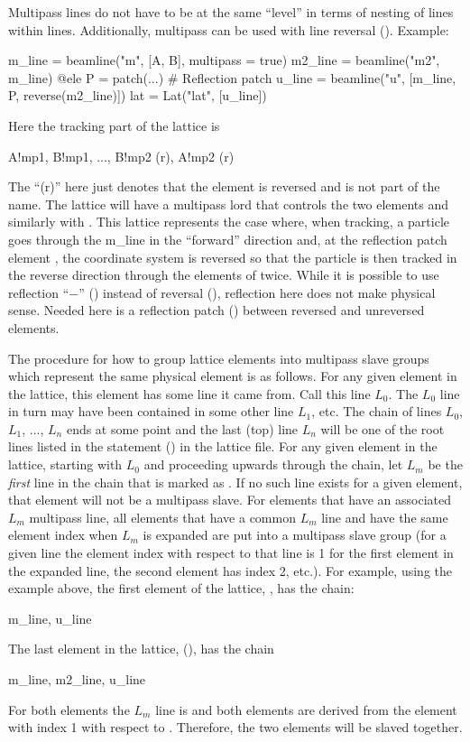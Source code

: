 Multipass lines do not have to be at the same ``level'' in terms of nesting of lines within
lines. Additionally, multipass can be used with line reversal (). Example:
\begin{example}
  m_line = beamline("m", [A, B], multipass = true)
  m2_line = beamline("m2", m_line)
  @ele P = patch(...)  # Reflection patch
  u_line = beamline("u", [m_line, P, reverse(m2_line)])
  lat = Lat("lat", [u_line])
\end{example}
Here the tracking part of the lattice is
\begin{example}
  A!mp1, B!mp1, ..., B!mp2 (r), A!mp2 (r)
\end{example}
The ``(r)'' here just denotes that the element is reversed and is not part of the name. The lattice
will have a multipass lord  that controls the two  elements and similarly with
. This lattice represents the case where, when tracking, 
a particle goes through the m_line in the ``forward''
direction and, at the reflection patch element , the coordinate system is reversed so that the particle
is then tracked in the reverse direction through the elements of  twice.
While it is possible to use reflection ``$-$'' () instead
of reversal (), reflection here does not make physical sense.  Needed
here is a reflection patch  () between reversed and unreversed elements.

The procedure for how to group lattice elements into multipass slave groups which represent the same
physical element is as follows. For any given element in the lattice, this element has some line it
came from. Call this line $L_0$. The $L_0$ line in turn may have been contained in some other line
$L_1$, etc. The chain of lines $L_0$, $L_1$, ..., $L_n$ ends at some point and the last (top) line
$L_n$ will be one of the root lines listed in the  statement () in the lattice
file. For any given element in the lattice, starting with $L_0$ and proceeding upwards through the
chain, let $L_m$ be the {\em first} line in the chain that is marked as . If no such
line exists for a given element, that element will not be a multipass slave. For elements that have
an associated $L_m$ multipass line, all elements that have a common $L_m$ line and have the same
element index when $L_m$ is expanded are put into a multipass slave group (for a given line the
element index with respect to that line is 1 for the first element in the expanded line, the second
element has index 2, etc.).  For example, using the example above, the first element of the lattice,
, has the chain:
\begin{example}
    m_line, u_line
\end{example} 
The last element in the lattice, (), has the chain
\begin{example}
  m_line, m2_line, u_line
\end{example}
For both elements the $L_m$ line is  and both elements are derived from the element with
index 1 with respect to . Therefore, the two elements will be slaved together.

